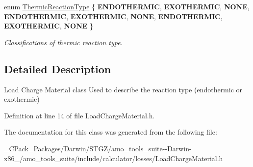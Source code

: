 \begin{DoxyCompactItemize}
\item 
\mbox{\label{class_load_charge_material_a51d4263e865a5d86236622dd3fe23fd1}} 
enum \hyperlink{class_load_charge_material_a51d4263e865a5d86236622dd3fe23fd1}{Thermic\+Reaction\+Type} \{ \newline
{\bfseries E\+N\+D\+O\+T\+H\+E\+R\+M\+IC}, 
{\bfseries E\+X\+O\+T\+H\+E\+R\+M\+IC}, 
{\bfseries N\+O\+NE}, 
{\bfseries E\+N\+D\+O\+T\+H\+E\+R\+M\+IC}, 
\newline
{\bfseries E\+X\+O\+T\+H\+E\+R\+M\+IC}, 
{\bfseries N\+O\+NE}, 
{\bfseries E\+N\+D\+O\+T\+H\+E\+R\+M\+IC}, 
{\bfseries E\+X\+O\+T\+H\+E\+R\+M\+IC}, 
\newline
{\bfseries N\+O\+NE}
 \}\begin{DoxyCompactList}\small\item\em Classifications of thermic reaction type. \end{DoxyCompactList}
\end{DoxyCompactItemize}


\subsection{Detailed Description}
Load Charge Material class Used to describe the reaction type (endothermic or exothermic) 

Definition at line 14 of file Load\+Charge\+Material.\+h.



The documentation for this class was generated from the following file\+:\begin{DoxyCompactItemize}
\item 
\+\_\+\+C\+Pack\+\_\+\+Packages/\+Darwin/\+S\+T\+G\+Z/amo\+\_\+tools\+\_\+suite-\/-\/\+Darwin-\/x86\+\_/amo\+\_\+tools\+\_\+suite/include/calculator/losses/Load\+Charge\+Material.\+h\end{DoxyCompactItemize}
